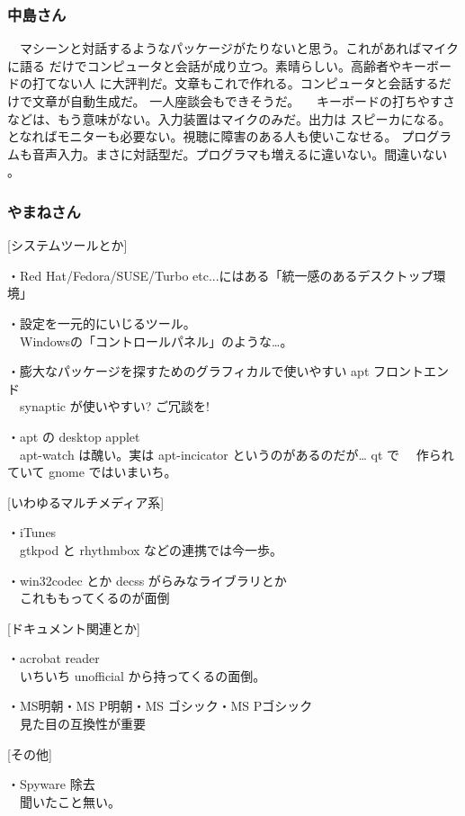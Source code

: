 \documentclass[mingoth]{jsarticle}
\begin{document}
\subsubsection{中島さん}

　マシーンと対話するようなパッケージがたりないと思う。これがあればマイクに語る
だけでコンピュータと会話が成り立つ。素晴らしい。高齢者やキーボードの打てない人
に大評判だ。文章もこれで作れる。コンピュータと会話するだけで文章が自動生成だ。
一人座談会もできそうだ。
　キーボードの打ちやすさなどは、もう意味がない。入力装置はマイクのみだ。出力は
スピーカになる。となればモニターも必要ない。視聴に障害のある人も使いこなせる。
プログラムも音声入力。まさに対話型だ。プログラマも増えるに違いない。間違いない
。

\subsubsection{やまねさん}

[システムツールとか]

・Red Hat/Fedora/SUSE/Turbo etc...にはある「統一感のあるデスクトップ環境」

・設定を一元的にいじるツール。\\
　Windowsの「コントロールパネル」のような…。

・膨大なパッケージを探すためのグラフィカルで使いやすい apt フロントエンド\\
　synaptic が使いやすい? ご冗談を!

・apt の desktop applet \\
　apt-watch は醜い。実は apt-incicator というのがあるのだが… qt で
　作られていて gnome ではいまいち。


[いわゆるマルチメディア系]

・iTunes\\
　gtkpod と rhythmbox などの連携では今一歩。

・win32codec とか decss がらみなライブラリとか \\
　これももってくるのが面倒


[ドキュメント関連とか]

・acrobat reader\\
　いちいち unofficial から持ってくるの面倒。

・MS明朝・MS P明朝・MS ゴシック・MS Pゴシック\\
　見た目の互換性が重要


[その他]

・Spyware 除去\\
　聞いたこと無い。
\end{document}
